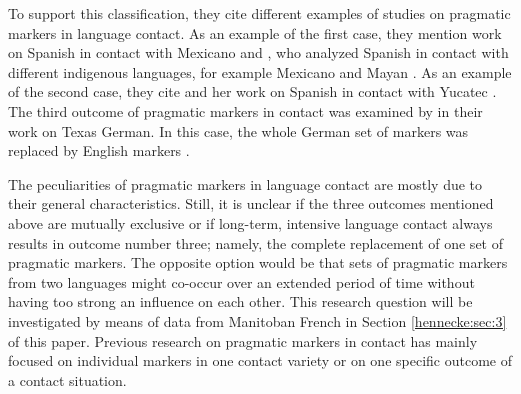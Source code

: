 \documentclass[output=paper]{langscibook}
\begin{document}
To support this classification, they cite different examples of studies on pragmatic markers in language contact. As an example of the first case, they mention  work on Spanish in contact with Mexicano  and \citet{Brody.1987}, who analyzed Spanish in contact with different indigenous languages, for example Mexicano and Mayan \citep[264]{Torres.2008}. As an example of the second case, they cite \citet{Solomon.1995} and her work on Spanish in contact with Yucatec \citep[265]{Torres.2008}. The third outcome of pragmatic markers in contact was examined by \citet{Goss.2000} in their work on Texas German. In this case, the whole German set of markers was replaced by English markers \citep{Goss.2000}.

The peculiarities of pragmatic markers in language contact are mostly due to their general characteristics. Still, it is unclear if the three outcomes mentioned above are mutually exclusive or if long-term, intensive language contact always results in outcome number three; namely, the complete replacement of one set of pragmatic markers. The opposite option would be that sets of pragmatic markers from two languages might co-occur over an extended period of time without having too strong an influence on each other. This research question will be investigated by means of data from Manitoban French in Section \ref{hennecke:sec:3} of this paper. Previous research on pragmatic markers in contact has mainly focused on individual markers in one contact variety or on one specific outcome of a contact situation. 
\end{document}

